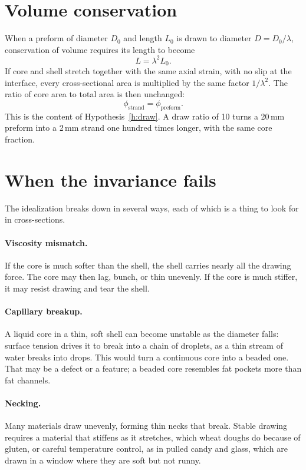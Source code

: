 \documentclass[11pt,openany]{book}
\theoremstyle{definition}
\begin{document}
\section{Volume conservation}

When a preform of diameter $D_0$ and length $L_0$ is drawn to diameter $D = D_0/\lambda$, conservation of volume requires its length to become
\[
L = \lambda^2 L_0 .
\]
If core and shell stretch together with the same axial strain, with no slip at the interface, every cross-sectional area is multiplied by the same factor $1/\lambda^2$. The ratio of core area to total area is then unchanged:
\[
\phi_{\text{strand}} = \phi_{\text{preform}}.
\]
This is the content of Hypothesis~\ref{h:draw}. A draw ratio of 10 turns a 20\,mm preform into a 2\,mm strand one hundred times longer, with the same core fraction.

\section{When the invariance fails}

The idealization breaks down in several ways, each of which is a thing to look for in cross-sections.

\paragraph{Viscosity mismatch.} If the core is much softer than the shell, the shell carries nearly all the drawing force. The core may then lag, bunch, or thin unevenly. If the core is much stiffer, it may resist drawing and tear the shell.

\paragraph{Capillary breakup.} A liquid core in a thin, soft shell can become unstable as the diameter falls: surface tension drives it to break into a chain of droplets, as a thin stream of water breaks into drops. This would turn a continuous core into a beaded one. That may be a defect or a feature; a beaded core resembles fat pockets more than fat channels.

\paragraph{Necking.} Many materials draw unevenly, forming thin necks that break. Stable drawing requires a material that stiffens as it stretches, which wheat doughs do because of gluten, or careful temperature control, as in pulled candy and glass, which are drawn in a window where they are soft but not runny.
\end{document}

